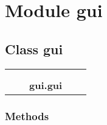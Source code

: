 %
%
%


\section{Module gui}

    \label{gui}




\subsection{Class gui}

    \label{gui:gui}
\begin{tabular}{cccccc}
\multicolumn{2}{r}{\settowidth{\BCL}{object}\multirow{2}{\BCL}{object}}
&&
  \\\cline{3-3}
  &&\multicolumn{1}{c|}{}
&&
  \\
&&\multicolumn{2}{l}{\textbf{gui.gui}}
\end{tabular}



  \subsubsection{Methods}

    \vspace{0.5ex}

